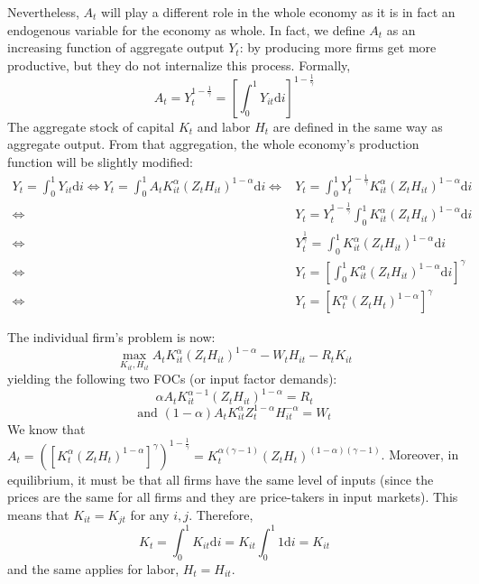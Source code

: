 \documentclass[12pt]{report}
\def\D{\mathrm{d}}
\def\D{\mathrm{d}}
\begin{document}
Nevertheless, $A_t$ will play a different role in the whole economy as it is in fact an endogenous variable for the economy as whole. In fact, we define $A_t$ as an increasing function of aggregate output $Y_t$: by producing more firms get more productive, but they do not internalize this process. Formally, $$A_t = Y_t^{1 - \frac{1}{\gamma}} = \left[\int_{0}^1 Y_{it}\D i\right]^{1 - \frac{1}{\gamma}} $$ The aggregate stock of capital $K_t$ and labor $H_t$ are defined in the same way as aggregate output. From that aggregation, the whole economy's production function will be slightly modified: \begin{align*}
Y_t = \int_{0}^{1} Y_{it}\D i \Leftrightarrow Y_t = \int_{0}^{1}A_tK_{it}^\alpha (Z_tH_{it})^{1-\alpha}\D i \Leftrightarrow & Y_t = \int_{0}^{1}Y_t^{1-\frac{1}{\gamma}}K_{it}^\alpha (Z_tH_{it})^{1-\alpha}\D i\\ \Leftrightarrow & Y_t = Y_t^{1-\frac{1}{\gamma}}\int_{0}^{1}K_{it}^\alpha (Z_tH_{it})^{1-\alpha}\D i \\ \Leftrightarrow & Y_t^{\frac{1}{\gamma}} = \int_{0}^{1}K_{it}^\alpha (Z_tH_{it})^{1-\alpha}\D i \\ \Leftrightarrow & Y_t = \left[ \int_{0}^{1}K_{it}^\alpha (Z_tH_{it})^{1-\alpha}\D i\right]^{\gamma} \\ \Leftrightarrow & Y_t = \left[ K_{t}^\alpha (Z_tH_{t})^{1-\alpha}\right]^{\gamma} 
\end{align*}

The individual firm's problem is now: $$\max_{K_{it}, H_{it}} A_tK_{it}^\alpha (Z_tH_{it})^{1-\alpha} - W_tH_{it} - R_tK_{it} $$ yielding the following two FOCs (or input factor demands): $$\alpha A_t K_{it}^{\alpha - 1} (Z_tH_{it})^{1-\alpha} = R_t $$ $$\text{and }(1 - \alpha) A_t K_{it}^{\alpha} Z_t^{1-\alpha} H_{it}^{-\alpha} = W_t $$ We know that $A_t = \left(\left[ K_{t}^\alpha (Z_tH_{t})^{1-\alpha}\right]^{\gamma}\right)^{1 - \frac{1}{\gamma}} = K_t^{\alpha(\gamma - 1)}(Z_tH_{t})^{(1-\alpha)(\gamma - 1)}$. Moreover, in equilibrium, it must be that all firms have the same level of inputs (since the prices are the same for all firms and they are price-takers in input markets). This means that $K_{it} = K_{jt}$ for any $i, j$. Therefore, $$K_t = \int_0^1 K_{it}\D i = K_{it} \int_0^1 1\D i = K_{it} $$ and the same applies for labor, $H_t = H_{it}$.
\end{document}
